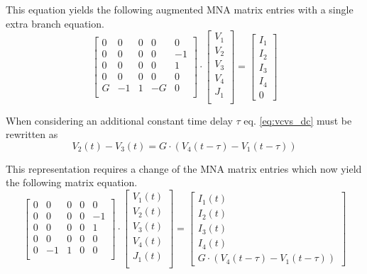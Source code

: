This equation yields the following augmented MNA matrix entries with a
single extra branch equation.
\begin{equation}
\begin{bmatrix}
0 & 0 & 0 & 0 & 0\\
0 & 0 & 0 & 0 & -1\\
0 & 0 & 0 & 0 & 1\\
0 & 0 & 0 & 0 & 0\\
G & -1 & 1 & -G & 0\\
\end{bmatrix}
\cdot
\begin{bmatrix}
V_1\\
V_2\\
V_3\\
V_4\\
J_1\\
\end{bmatrix}
=
\begin{bmatrix}
I_1\\
I_2\\
I_3\\
I_4\\
0
\end{bmatrix}
\end{equation}

When considering an additional constant time delay $\tau$
eq. \eqref{eq:vcvs_dc} must be rewritten as
\begin{equation}
\label{eq:vcvs_delay}
V_2\left(t\right) - V_3\left(t\right) = G\cdot\left(V_4\left(t - \tau\right) - V_1\left(t - \tau\right)\right)
\end{equation}

This representation requires a change of the MNA matrix entries which
now yield the following matrix equation.
\begin{equation}
\begin{bmatrix}
0 & 0 & 0 & 0 & 0\\
0 & 0 & 0 & 0 & -1\\
0 & 0 & 0 & 0 & 1\\
0 & 0 & 0 & 0 & 0\\
0 & -1 & 1 & 0 & 0\\
\end{bmatrix}
\cdot
\begin{bmatrix}
V_1\left(t\right)\\
V_2\left(t\right)\\
V_3\left(t\right)\\
V_4\left(t\right)\\
J_1\left(t\right)\\
\end{bmatrix}
=
\begin{bmatrix}
I_1\left(t\right)\\
I_2\left(t\right)\\
I_3\left(t\right)\\
I_4\left(t\right)\\
G\cdot\left(V_4\left(t - \tau\right) - V_1\left(t - \tau\right)\right)
\end{bmatrix}
\end{equation}

